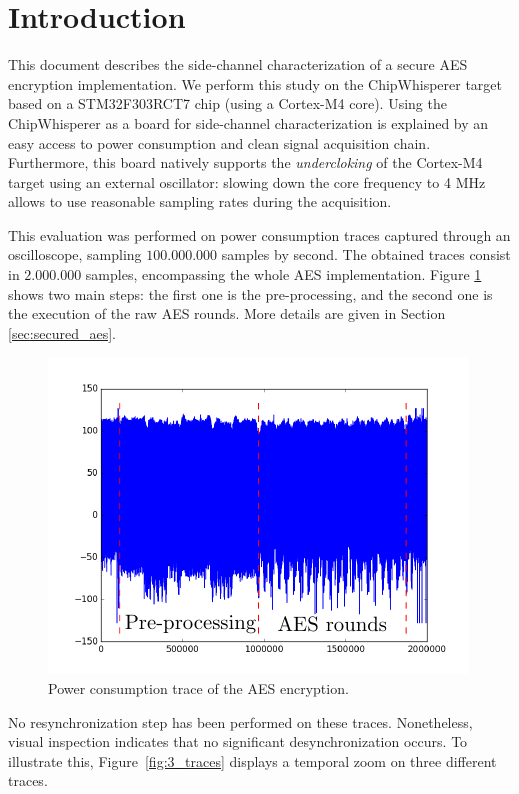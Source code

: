 \section{Introduction}
This document describes the side-channel characterization of a secure AES encryption implementation. 
We perform this study on the ChipWhisperer target based on a STM32F303RCT7 chip (using a Cortex-M4 core).
Using the ChipWhisperer as a board for side-channel characterization
is explained by an easy access to power consumption and clean signal acquisition chain. Furthermore,
this board natively supports the \emph{undercloking} of the Cortex-M4 target using an external
oscillator: slowing down the core frequency to 4 MHz allows to use reasonable sampling rates during
the acquisition.

This evaluation was performed on power consumption traces captured through an oscilloscope, sampling $100.000.000$ samples by second. The obtained traces consist in $2.000.000$ samples, encompassing the whole AES implementation. 
Figure \ref{fig:sample_trace} shows two main steps: the first one is the pre-processing, and the second one is the execution of the raw AES rounds. More details are given in Section \ref{sec:secured_aes}.


\begin{figure}[h!]
  \centering 
  \includegraphics[scale=1]{figures/sample_traces_2M_label.pdf}
  \caption{Power consumption trace of the AES encryption.}
  \label{fig:sample_trace}
\end{figure}

No resynchronization step has been performed on these traces. Nonetheless, visual inspection indicates that no significant desynchronization occurs. To illustrate this, Figure~\ref{fig:3_traces} displays a temporal zoom on three different traces.

